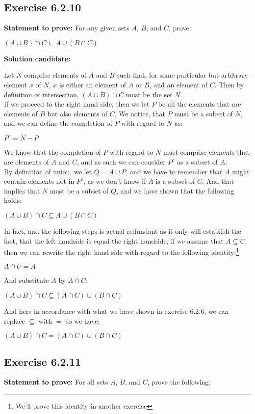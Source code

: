 \documentclass{report}
\newcommand{\cent}[1]{\begin{center}#1\end{center}}
\newcommand{\Prove}{\textbf{Statement to prove: }}
\newcommand{\solution}{\textbf{Solution candidate: }}
\newcommand{\QED}{\boxed{}}
\newcommand{\Exercise}[1]{\subsection{Exercise #1}}
\begin{document}
	\Exercise{6.2.10}
	
	\Prove
	For any given sets $A$, $B$, and $C$, prove:
	
	\cent{$(A \cup B) \cap C \subseteq A \cup (B \cap C)$}
	
	\solution
	
	Let $N$ comprise elements of $A$ and $B$ such that, for some particular but arbitrary element $x$ of $N$, $x$ is either an element of $A$ or $B$, and an element of $C$. Then by definition of intersection, $(A \cup B) \cap C$ must be the set $N$. \\
	
	If we proceed to the right hand side, then we let $P$ be all the elements that are elements of $B$ but also elements of $C$. We notice, that $P$ must  be a subset of $N$, and we can define the completion of $P$ with regard to $N$ as:
	
	\cent{$P^c = N - P$}
	
	We know that the completion of $P$ with regard to $N$ must comprise elements that are elements of $A$ and $C$, and as such we can consider $P^c$ as a subset of $A$.\\
	
	By definition of union, we let $Q = A \cup P$, and we have to remember that $A$ might contain elements not in $P^c$, as we don't know if $A$ is a subset of $C$. And that implies that $N$ must be a subset of $Q$, and we have shown that the following holds:
	
	\cent{$(A \cup B) \cap C \subseteq A \cup (B \cap C)$}
	
	In fact, and the following steps is actual  redundant as it only will establish the fact, that the left handside is equal the right handside, if we assume that  $A \subseteq C$, then we can rewrite the right hand side with regard to the following identity:\footnote{We'll prove this identity in another exercise}
	
	\cent{$A \cap U = A$}
	
	And substitute $A$ by $A \cap C$:
	
	\cent{$(A \cup B) \cap C \subseteq (A \cap C) \cup (B \cap C)$}
	
	And here in accordance with what we have shown in exercise 6.2.6,  we can replace $\subseteq$ with $=$ so we have:
	\cent{$(A \cup B) \cap C = (A \cap C) \cup (B \cap C)$}
	\QED
	
	\Exercise{6.2.11}
	
	\Prove
	For all sets $A$, $B$, and $C$, prove the following:
	
\end{document}
